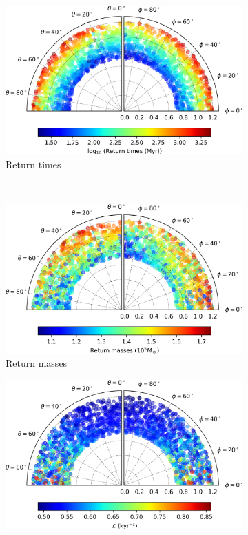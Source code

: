 	\begin{figure}[h]
		\centering
		\begin{subfigure}[t]{0.49\textwidth}
			\includegraphics[width = \textwidth]{"../Files/Week 13/smallerD_time"}
			\caption{Return times}
			\label{fig: smallerD_time}
		\end{subfigure}
		~ 
		\begin{subfigure}[t]{0.49\textwidth}
			\includegraphics[width=\textwidth]{"../Files/Week 13/smallerD_mass"}
			\caption{Return masses}
			\label{fig: smallerD_mass}
		\end{subfigure}
		\begin{subfigure}[t]{0.6\textwidth}
			\includegraphics[width=\textwidth]{"../Files/Week 13/smallerD_lyapunov"}

\end{subfigure}
\end{figure}
